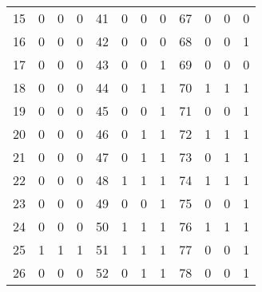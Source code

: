 \documentclass[a4paper,fleqn]{cas-dc}
\begin{document}
\begin{table}[htbp]
{\begin{tabularx}{\columnwidth}{YYYYYYYYYYYY}
    15    & 0     & 0     & 0     & 41    & 0     & 0     & 0     & 67    & 0     & 0     & 0 \\
    16    & 0     & 0     & 0     & 42    & 0     & 0     & 0     & 68    & 0     & 0     & 1 \\
    17    & 0     & 0     & 0     & 43    & 0     & 0     & 1     & 69    & 0     & 0     & 0 \\
    18    & 0     & 0     & 0     & 44    & 0     & 1     & 1     & 70    & 1     & 1     & 1 \\
    19    & 0     & 0     & 0     & 45    & 0     & 0     & 1     & 71    & 0     & 0     & 1 \\
    20    & 0     & 0     & 0     & 46    & 0     & 1     & 1     & 72    & 1     & 1     & 1 \\
    21    & 0     & 0     & 0     & 47    & 0     & 1     & 1     & 73    & 0     & 1     & 1 \\
    22    & 0     & 0     & 0     & 48    & 1     & 1     & 1     & 74    & 1     & 1     & 1 \\
    23    & 0     & 0     & 0     & 49    & 0     & 0     & 1     & 75    & 0     & 0     & 1 \\
    24    & 0     & 0     & 0     & 50    & 1     & 1     & 1     & 76    & 1     & 1     & 1 \\
    25    & 1     & 1     & 1     & 51    & 1     & 1     & 1     & 77    & 0     & 0     & 1 \\
    26    & 0     & 0     & 0     & 52    & 0     & 1     & 1     & 78    & 0     & 0     & 1 \\
    \hline
    \end{tabularx}
    \label{tab_plan_line}
    }
\end{table}
\end{document}
